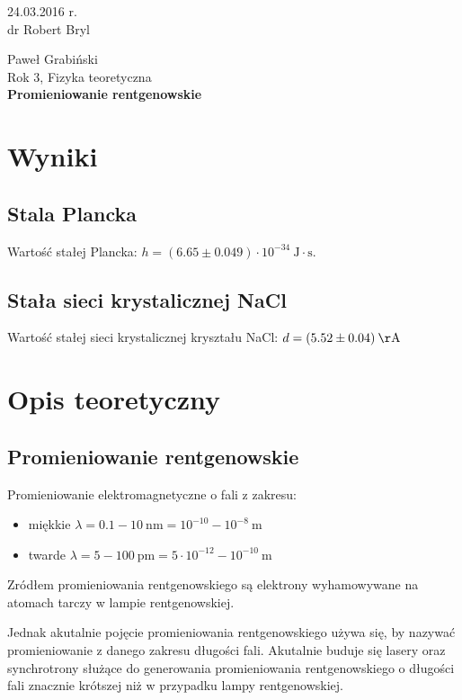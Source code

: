 \documentclass[paper=a4, fontsize=12pt]{scrartcl}
\begin{document}
\begin{flushright}
24.03.2016 r.\\
dr Robert Bryl
\end{flushright}Paweł Grabiński\\
Rok 3, Fizyka teoretyczna\\[0.5cm]
{\huge \bf Promieniowanie rentgenowskie}
\section{Wyniki}
\subsection{Stala Plancka}
Wartość stałej Plancka: $h=(6.65\pm0.049)\cdot10^{-34}\:\mathrm{J\cdot s}$.
\subsection{Stała sieci krystalicznej NaCl}
Wartość stałej sieci krystalicznej kryształu NaCl: $d=(5.52\pm0.04)\:\mathrm{\AA}$
\section{Opis teoretyczny}
\subsection{Promieniowanie rentgenowskie}

Promieniowanie elektromagnetyczne o fali z zakresu:
\begin{itemize}
	\item miękkie $\lambda=0.1-10\:\mathrm{nm}=10^{-10}-10^{-8}\:\mathrm{m}$
	\item twarde $\lambda=5-100\:\mathrm{pm}=5\cdot10^{-12}-10^{-10}\:\mathrm{m}$
\end{itemize}

Zródłem promieniowania rentgenowskiego są elektrony wyhamowywane na atomach tarczy w lampie rentgenowskiej.

Jednak akutalnie pojęcie promieniowania rentgenowskiego używa się, by nazywać promieniowanie z danego zakresu długości fali. Akutalnie buduje się lasery oraz synchrotrony służące do generowania promieniowania rentgenowskiego o długości fali znacznie krótszej niż w przypadku lampy rentgenowskiej.
\end{document}

